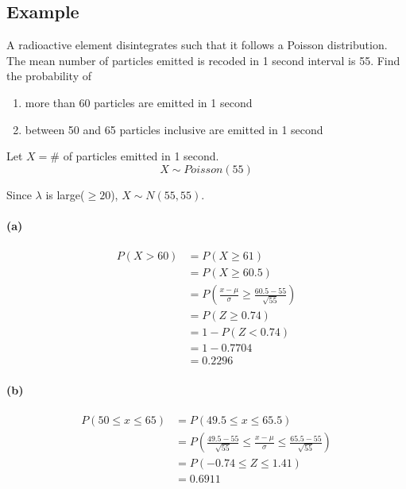 \documentclass{article}
\begin{document}
    \subsection*{Example}
    A radioactive element disintegrates such that it follows a Poisson distribution. The
    mean number of particles emitted is recoded in 1 second interval is 55. Find the probability of

    \begin{enumerate}[label={(\alph*)}]
        \item more than 60 particles are emitted in 1 second
        \item  between 50 and 65 particles inclusive are emitted in 1 second
    \end{enumerate}

    Let $X = \#$ of particles emitted in 1 second.
    \begin{equation*}
        X \sim Poisson(55)
    \end{equation*}

    Since $\lambda $ is large($\geq 20$), $X \sim N(55, 55)$.

    \paragraph{(a)}
    \begin{align*}
    P(X > 60) &= P(X \geq 61)\\
    &=P(X \geq 60.5)\\
    & = P(\frac{x-\mu}{\sigma} \geq \frac{60.5 - 55}{\sqrt{55}})\\
    & = P(Z \geq 0.74)\\
    & = 1 - P(Z < 0.74)\\
    & =1-0.7704\\
    & = 0.2296
    \end{align*}

    \paragraph*{(b)}
    \begin{align*}
        P(50 \leq x \leq 65) &= P(49.5 \leq x \leq 65.5)\\
        & = P(\frac{49.5-55}{\sqrt{55}} \leq \frac{x-\mu}{\sigma} \leq \frac{65.5-55}{\sqrt{55}})\\
        & = P(-0.74 \leq Z \leq 1.41)\\
        & = 0.6911
    \end{align*}
\end{document}
